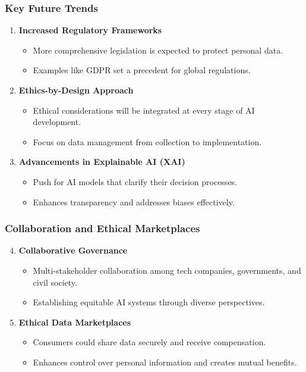 \documentclass[aspectratio=169]{beamer}
\begin{document}
\begin{frame}[fragile]
    \frametitle{Key Future Trends}
    \begin{enumerate}
        \item \textbf{Increased Regulatory Frameworks}
            \begin{itemize}
                \item More comprehensive legislation is expected to protect personal data.
                \item Examples like GDPR set a precedent for global regulations.
            \end{itemize}
        \item \textbf{Ethics-by-Design Approach}
            \begin{itemize}
                \item Ethical considerations will be integrated at every stage of AI development.
                \item Focus on data management from collection to implementation.
            \end{itemize}
        \item \textbf{Advancements in Explainable AI (XAI)}
            \begin{itemize}
                \item Push for AI models that clarify their decision processes.
                \item Enhances transparency and addresses biases effectively.
            \end{itemize}
    \end{enumerate}
\end{frame}

\begin{frame}[fragile]
    \frametitle{Collaboration and Ethical Marketplaces}
    \begin{enumerate}
        \setcounter{enumi}{3}
        \item \textbf{Collaborative Governance}
            \begin{itemize}
                \item Multi-stakeholder collaboration among tech companies, governments, and civil society.
                \item Establishing equitable AI systems through diverse perspectives.
            \end{itemize}
        \item \textbf{Ethical Data Marketplaces}
            \begin{itemize}
                \item Consumers could share data securely and receive compensation.
                \item Enhances control over personal information and creates mutual benefits.
            \end{itemize}
    \end{enumerate}
\end{frame}
\end{document}
